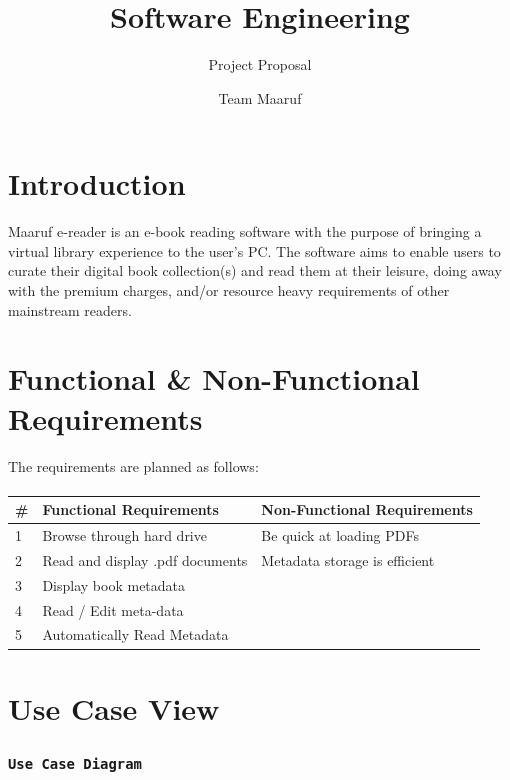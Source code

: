 \documentclass[answers]{exam}
\title{Software Engineering}
\author{Project Proposal}
\date{Team Maaruf}
\begin{document}
\maketitle
\newpage
\tableofcontents

\newpage
\section{Introduction}
Maaruf e-reader is an e-book reading software with the purpose of bringing a virtual library experience to the user's PC. The software aims to enable users to curate their digital book collection(s) and read them at their leisure, doing away with the premium charges, and/or resource heavy requirements of other mainstream readers.


\section{Functional \& Non-Functional Requirements}
The requirements are planned as follows:
\paragraph{}
\begin{table}[h!]
\begin{tabular}{|l|l|l|}
\hline
\textbf{\#} & \textbf{Functional Requirements} & \textbf{Non-Functional Requirements} \\ \hline
1           & Browse through hard drive        & Be quick at loading PDFs           \\ \hline
2           & Read and display .pdf documents  & Metadata storage is efficient                     \\ \hline
3           & Display book metadata             &                    \\ \hline
4           & Read / Edit meta-data             &                \\ \hline
5           & Automatically Read Metadata                                 &               \\ \hline
\end{tabular}
\end{table}

\section{Use Case View}
\subsubsection{\texttt{Use Case Diagram}}
\end{document}
